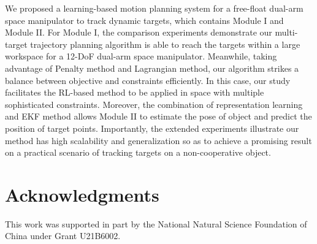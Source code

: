 \documentclass{article}
\begin{document}
We proposed a learning-based motion planning system for a free-float dual-arm space manipulator to track dynamic targets, which contains Module I and Module II. For Module I, the comparison experiments demonstrate our multi-target trajectory planning algorithm is able to reach the targets within a large workspace for a 12-DoF dual-arm space manipulator. Meanwhile, taking advantage of Penalty method and Lagrangian method, our algorithm strikes a balance between objective and constraints efficiently. In this case, our study facilitates the RL-based method to be applied in space with multiple sophisticated constraints. Moreover, the combination of representation learning and EKF method allows Module II to estimate the pose of object and predict the position of target points. Importantly, the extended experiments illustrate our method has high scalability and generalization so as to achieve a promising result on a practical scenario of tracking targets on a non-cooperative object.


\section*{Acknowledgments}
This work was supported in part by the National Natural Science Foundation of China under Grant U21B6002. 

  
  
\end{document}
